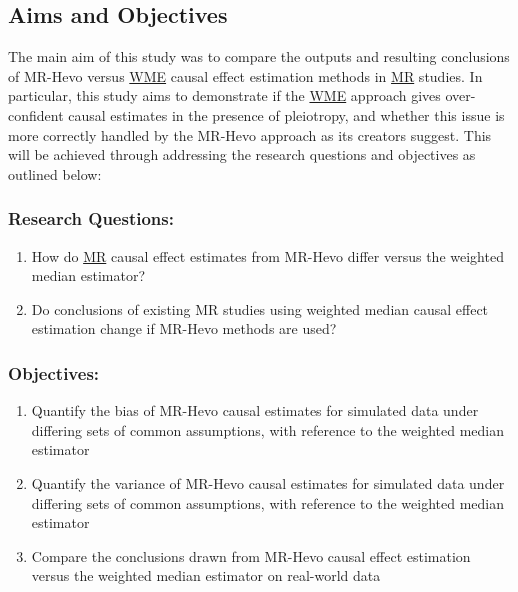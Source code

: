 \documentclass[
]{article}
\providecommand{\tightlist}{%
  \setlength{\itemsep}{0pt}\setlength{\parskip}{0pt}}
\begin{document}
\subsection{Aims and Objectives}\label{aims-and-objectives}

The main aim of this study was to compare the outputs and resulting conclusions of MR-Hevo versus \hyperref[acronyms_WME]{WME} causal effect estimation methods in \hyperref[acronyms_MR]{MR} studies. In particular, this study aims to demonstrate if the \hyperref[acronyms_WME]{WME} approach gives over-confident causal estimates in the presence of pleiotropy, and whether this issue is more correctly handled by the MR-Hevo approach as its creators suggest. This will be achieved through addressing the research questions and objectives as outlined below:

\subsubsection*{Research Questions:}\label{research-questions}

\begin{enumerate}
\def\labelenumi{\arabic{enumi}.}
\tightlist
\item
  How do \hyperref[acronyms_MR]{MR} causal effect estimates from MR-Hevo differ versus the weighted median estimator?
\item
  Do conclusions of existing MR studies using weighted median causal effect estimation change if MR-Hevo methods are used?
\end{enumerate}

\subsubsection*{Objectives:}\label{objectives}

\begin{enumerate}
\def\labelenumi{\arabic{enumi}.}
\tightlist
\item
  Quantify the bias of MR-Hevo causal estimates for simulated data under differing sets of common assumptions, with reference to the weighted median estimator
\item
  Quantify the variance of MR-Hevo causal estimates for simulated data under differing sets of common assumptions, with reference to the weighted median estimator
\item
  Compare the conclusions drawn from MR-Hevo causal effect estimation versus the weighted median estimator on real-world data
\end{enumerate}
\end{document}
